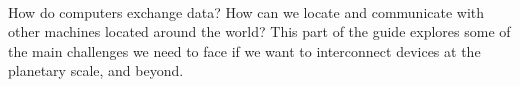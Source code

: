 \ \\[-10cm]
How do computers exchange data? How can we locate and communicate with other machines located around the world?
This part of the guide explores some of the main challenges we need to face if we want to interconnect devices at the planetary scale, and beyond.
